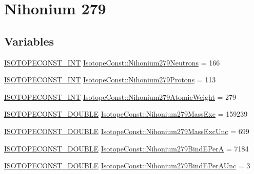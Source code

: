 \hypertarget{group___isotope_const-_nihonium-_nh279}{}\section{Nihonium 279}
\label{group___isotope_const-_nihonium-_nh279}
\subsection*{Variables}
\begin{DoxyCompactItemize}
\item 
\mbox{\hyperlink{group___isotope_const-_macros_ga5f18360b3e99483a35c32d789e62621c}{I\+S\+O\+T\+O\+P\+E\+C\+O\+N\+S\+T\+\_\+\+I\+NT}} \mbox{\hyperlink{group___isotope_const-_nihonium-_nh279_ga1c8884411fa2aaa2b6c4be7a45e0a468}{Isotope\+Const\+::\+Nihonium279\+Neutrons}} = 166
\item 
\mbox{\hyperlink{group___isotope_const-_macros_ga5f18360b3e99483a35c32d789e62621c}{I\+S\+O\+T\+O\+P\+E\+C\+O\+N\+S\+T\+\_\+\+I\+NT}} \mbox{\hyperlink{group___isotope_const-_nihonium-_nh279_ga3cc58973a33cfbf1d7f0d574e70a56ba}{Isotope\+Const\+::\+Nihonium279\+Protons}} = 113
\item 
\mbox{\hyperlink{group___isotope_const-_macros_ga5f18360b3e99483a35c32d789e62621c}{I\+S\+O\+T\+O\+P\+E\+C\+O\+N\+S\+T\+\_\+\+I\+NT}} \mbox{\hyperlink{group___isotope_const-_nihonium-_nh279_gad3a12981590f34636a35fa22931e727b}{Isotope\+Const\+::\+Nihonium279\+Atomic\+Weight}} = 279
\item 
\mbox{\hyperlink{group___isotope_const-_macros_ga8f45a7272ce02c0b4c65c44636ed719a}{I\+S\+O\+T\+O\+P\+E\+C\+O\+N\+S\+T\+\_\+\+D\+O\+U\+B\+LE}} \mbox{\hyperlink{group___isotope_const-_nihonium-_nh279_gac60fa7b58d42f6f9ad7b7d358ef57c97}{Isotope\+Const\+::\+Nihonium279\+Mass\+Exc}} = 159239
\item 
\mbox{\hyperlink{group___isotope_const-_macros_ga8f45a7272ce02c0b4c65c44636ed719a}{I\+S\+O\+T\+O\+P\+E\+C\+O\+N\+S\+T\+\_\+\+D\+O\+U\+B\+LE}} \mbox{\hyperlink{group___isotope_const-_nihonium-_nh279_ga3102d8e22365cbc451edccebf997d3cf}{Isotope\+Const\+::\+Nihonium279\+Mass\+Exc\+Unc}} = 699
\item 
\mbox{\hyperlink{group___isotope_const-_macros_ga8f45a7272ce02c0b4c65c44636ed719a}{I\+S\+O\+T\+O\+P\+E\+C\+O\+N\+S\+T\+\_\+\+D\+O\+U\+B\+LE}} \mbox{\hyperlink{group___isotope_const-_nihonium-_nh279_ga92d2d6a0df50c0b7c707da4fc31da74e}{Isotope\+Const\+::\+Nihonium279\+Bind\+E\+PerA}} = 7184
\item 
\mbox{\hyperlink{group___isotope_const-_macros_ga8f45a7272ce02c0b4c65c44636ed719a}{I\+S\+O\+T\+O\+P\+E\+C\+O\+N\+S\+T\+\_\+\+D\+O\+U\+B\+LE}} \mbox{\hyperlink{group___isotope_const-_nihonium-_nh279_ga6503a542eaea3790df4d36ded7c74961}{Isotope\+Const\+::\+Nihonium279\+Bind\+E\+Per\+A\+Unc}} = 3

\end{DoxyCompactItemize}
